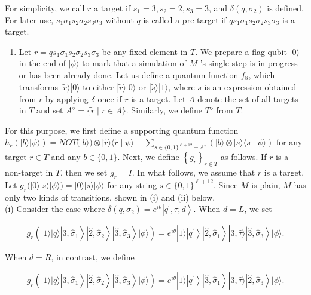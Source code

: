 \documentclass[10pt]{article}
\begin{document}
For simplicity, we call $r$ a target if $s_{1}=3, s_{2}=2, s_{3}=3$, and $\delta\left(q, \sigma_{2}\right)$ is defined. For later use, $s_{1} \sigma_{1} s_{2} \sigma_{2} s_{3} \sigma_{3}$ without $q$ is called a pre-target if $q s_{1} \sigma_{1} s_{2} \sigma_{2} s_{3} \sigma_{3}$ is a target.

\begin{enumerate}
  \item Let $r=q s_{1} \sigma_{1} s_{2} \sigma_{2} s_{3} \sigma_{3}$ be any fixed element in $T$. We prepare a flag qubit $|0\rangle$ in the end of $|\phi\rangle$ to mark that a simulation of $M$ 's single step is in progress or has been already done. Let us define a quantum function $f_{8}$, which transforms $|\tilde{r}\rangle|0\rangle$ to either $|\tilde{r}\rangle|0\rangle$ or $|\tilde{s}\rangle|1\rangle$, where $s$ is an expression obtained from $r$ by applying $\delta$ once if $r$ is a target. Let $A$ denote the set of all targets in $T$ and set $A^{\diamond}=\{\tilde{r} \mid r \in A\}$. Similarly, we define $T^{\diamond}$ from $T$.
\end{enumerate}

For this purpose, we first define a supporting quantum function $h_{r}(|b\rangle|\psi\rangle)=N O T(|b\rangle) \otimes|\tilde{r}\rangle\langle\tilde{r} \mid \psi\rangle+ \sum_{s \in\{0,1\}^{\ell+12}-A^{\circ}}(|b\rangle \otimes|s\rangle\langle s \mid \psi\rangle)$ for any target $r \in T$ and any $b \in\{0,1\}$. Next, we define $\left\{g_{r}\right\}_{r \in T}$ as follows. If $r$ is a non-target in $T$, then we set $g_{r}=I$. In what follows, we assume that $r$ is a target. Let $g_{r}(|0\rangle|s\rangle|\phi\rangle)=|0\rangle|s\rangle|\phi\rangle$ for any string $s \in\{0,1\}^{\ell+12}$. Since $M$ is plain, $M$ has only two kinds of transitions, shown in (i) and (ii) below.\\
(i) Consider the case where $\delta\left(q, \sigma_{2}\right)=e^{i \theta}\left|q^{\prime}, \tau, d\right\rangle$. When $d=L$, we set

$$
g_{r}\left(|1\rangle|q\rangle\left|\hat{3}, \hat{\sigma}_{1}\right\rangle\left|\hat{2}, \hat{\sigma}_{2}\right\rangle\left|\hat{3}, \hat{\sigma}_{3}\right\rangle|\phi\rangle\right)=e^{i \theta}|1\rangle\left|q^{\prime}\right\rangle\left|\hat{2}, \hat{\sigma}_{1}\right\rangle|\hat{3}, \hat{\tau}\rangle\left|\hat{3}, \hat{\sigma}_{3}\right\rangle|\phi\rangle .
$$

When $d=R$, in contrast, we define

$$
g_{r}\left(|1\rangle|q\rangle\left|\hat{3}, \hat{\sigma}_{1}\right\rangle\left|\hat{2}, \hat{\sigma}_{2}\right\rangle\left|\hat{3}, \hat{\sigma}_{3}\right\rangle|\phi\rangle\right)=e^{i \theta}|1\rangle\left|q^{\prime}\right\rangle\left|\hat{3}, \hat{\sigma}_{1}\right\rangle|\hat{3}, \hat{\tau}\rangle\left|\hat{2}, \hat{\sigma}_{3}\right\rangle|\phi\rangle .
$$
\end{document}
